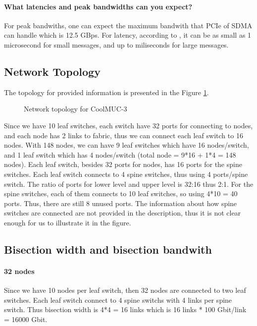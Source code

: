 \documentclass[article]{scrartcl}
\begin{document}
\paragraph{ What latencies and peak bandwidths can you expect?}
For peak bandwiths, one can expect the maximum bandwith that PCIe of SDMA can handle which is 12.5 GBps. For latency, according to \cite{omnipath}, it can be as small as 1 microsecond for small messages, and up to miliseconds for large messages.

\subsection{Network Topology}
The topology for provided information is presented in the Figure \ref{fig:ntopo}.
\begin{figure}[htpb]
    \centering
    \resizebox{\columnwidth}{!}{
    
  }
    \caption{Network topology for CoolMUC-3}
    \label{fig:ntopo}
\end{figure}
Since we have 10 leaf switches, each switch have 32 ports for connecting to nodes, and each node has 2 links to fabric, thus we can connect each leaf switch to 16 nodes. With 148 nodes, we can have 9 leaf switches which have 16 nodes/switch, and 1 leaf switch which has 4 nodes/switch (total node = 9*16 + 1*4 = 148 nodes).
Each leaf switch, besides 32 ports for nodes, has 16 ports for the spine switches. Each leaf switch connects to 4 spine switches, thus using 4 ports/spine switch. The ratio of ports for lower level and upper level is 32:16 thus 2:1. 
For the spine switches, each of them connects to 10 leaf switches, so using 4*10 = 40 ports. Thus, there are still 8 unused ports. The information about how spine switches are connected are not provided in the description, thus it is not clear enough for us to illustrate it in the figure.
\subsection{Bisection width and bisection bandwith}
\paragraph{32 nodes} Since we have 10 nodes per leaf switch, then 32 nodes are connected to two leaf switches. Each leaf switch connect to 4 spine switchs with 4 links per spine switch. Thus bisection width is 4*4 = 16 links which is 16 links * 100 Gbit/link = 16000 Gbit.
\end{document}
